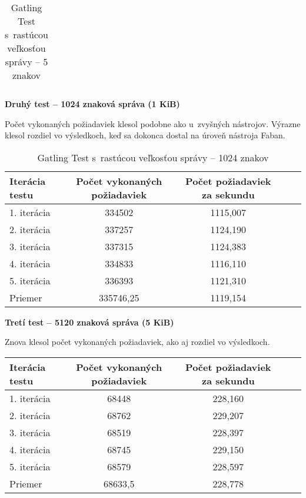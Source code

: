 \documentclass[12pt,oneside,final]{fithesis-utf8}
\begin{document}
\begin{itemize}
\begin{table}[H]
\begin{center}
\begin{tabular}{ | l | c | c | c | c |}
\end{tabular}
\end{center}
\caption{Gatling Test s~rastúcou veľkosťou správy -- 5 znakov}
\end{table}


\textbf{Druhý test -- 1024 znaková správa (1 KiB)}

Počet vykonaných požiadaviek klesol podobne ako u~zvyšných nástrojov. Výrazne klesol rozdiel vo výsledkoch, keď sa dokonca dostal na úroveň nástroja Faban.

\begin{table}[H]
\begin{center}
\begin{tabular}{ | l | c | c | c | c |}
		\hline
		 \textbf{Iterácia testu} & \textbf{Počet vykonaných požiadaviek} & \textbf{Počet požiadaviek za sekundu} \\ \hline
		 1. iterácia & 334502 & 1115,007 \\ \hline
		 2. iterácia & 337257 & 1124,190 \\ \hline
		 3. iterácia & 337315 & 1124,383 \\ \hline
		 4. iterácia & 334833 & 1116,110 \\ \hline
		 5. iterácia & 336393 & 1121,310 \\ \hline
		 Priemer & 335746,25 & 1119,154 \\ \hline
		 
\end{tabular}
\end{center}
\caption{Gatling Test s~rastúcou veľkosťou správy -- 1024 znakov}
\end{table}


\textbf{Tretí test -- 5120 znaková správa (5 KiB)}

Znova klesol počet vykonaných požiadaviek, ako aj rozdiel vo výsledkoch.

\begin{table}[H]
\begin{center}
\begin{tabular}{ | l | c | c | c | c |}
		\hline
		 \textbf{Iterácia testu} & \textbf{Počet vykonaných požiadaviek} & \textbf{Počet požiadaviek za sekundu} \\ \hline
		 1. iterácia & 68448 & 228,160 \\ \hline
		 2. iterácia & 68762 & 229,207 \\ \hline
		 3. iterácia & 68519 & 228,397 \\ \hline
		 4. iterácia & 68745 & 229,150 \\ \hline
		 5. iterácia & 68579 & 228,597 \\ \hline
		 Priemer & 68633,5 & 228,778 \\ \hline
		 

\end{tabular}
\end{center}
\end{table}
\end{itemize}
\end{document}
